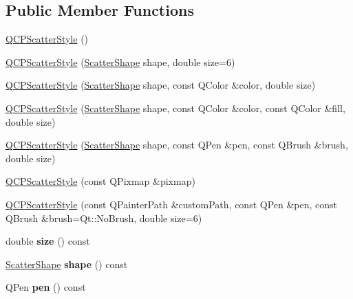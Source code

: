 \subsection*{Public Member Functions}
\begin{DoxyCompactItemize}
\item 
\hyperlink{classQCPScatterStyle_a8836018d9ad83ccd8870de8315c1be73}{Q\+C\+P\+Scatter\+Style} ()
\item 
\hyperlink{classQCPScatterStyle_a003d92f74f4561eda111862eadd62f28}{Q\+C\+P\+Scatter\+Style} (\hyperlink{classQCPScatterStyle_adb31525af6b680e6f1b7472e43859349}{Scatter\+Shape} shape, double size=6)
\item 
\hyperlink{classQCPScatterStyle_afa059da858c864c7e05871dc602d7eab}{Q\+C\+P\+Scatter\+Style} (\hyperlink{classQCPScatterStyle_adb31525af6b680e6f1b7472e43859349}{Scatter\+Shape} shape, const Q\+Color \&color, double size)
\item 
\hyperlink{classQCPScatterStyle_a6e1b64f12cac7f07af180ae4316fd38d}{Q\+C\+P\+Scatter\+Style} (\hyperlink{classQCPScatterStyle_adb31525af6b680e6f1b7472e43859349}{Scatter\+Shape} shape, const Q\+Color \&color, const Q\+Color \&fill, double size)
\item 
\hyperlink{classQCPScatterStyle_a85acc4941d7e5c9bca5fa51377a77f49}{Q\+C\+P\+Scatter\+Style} (\hyperlink{classQCPScatterStyle_adb31525af6b680e6f1b7472e43859349}{Scatter\+Shape} shape, const Q\+Pen \&pen, const Q\+Brush \&brush, double size)
\item 
\hyperlink{classQCPScatterStyle_a63962094587a4c2258435aa7933996cc}{Q\+C\+P\+Scatter\+Style} (const Q\+Pixmap \&pixmap)
\item 
\hyperlink{classQCPScatterStyle_a879c30647683b3cfbde2afecea815e6f}{Q\+C\+P\+Scatter\+Style} (const Q\+Painter\+Path \&custom\+Path, const Q\+Pen \&pen, const Q\+Brush \&brush=Qt\+::\+No\+Brush, double size=6)
\item 
double {\bfseries size} () const \hypertarget{classQCPScatterStyle_a1973ee650368f1c5f55507b78473f634}{}\label{classQCPScatterStyle_a1973ee650368f1c5f55507b78473f634}

\item 
\hyperlink{classQCPScatterStyle_adb31525af6b680e6f1b7472e43859349}{Scatter\+Shape} {\bfseries shape} () const \hypertarget{classQCPScatterStyle_a4462a25ef17769631f4e0aa81dadca4b}{}\label{classQCPScatterStyle_a4462a25ef17769631f4e0aa81dadca4b}

\item 
Q\+Pen {\bfseries pen} () const \hypertarget{classQCPScatterStyle_a3c24c3bf37b561b4807aed9f1418ab58}{}\label{classQCPScatterStyle_a3c24c3bf37b561b4807aed9f1418ab58}


\end{DoxyCompactItemize}
